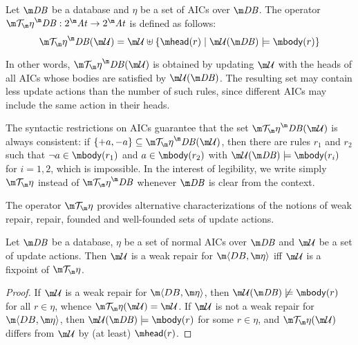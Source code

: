 \begin{definition}
  Let $\db$ be a database and $\eta$ be a set of AICs over $\db$.
  The operator $\Op^\db:2^\atoms\to 2^\atoms$ is defined as follows:
  \[
    \Op^\db(\UU) = \UU\uplus\{\head(r)\mid \UU(\db)\models\body(r)\}
  \]
\end{definition}
In other words, $\Op^\db(\UU)$ is obtained by updating $\UU$ with the heads of all AICs whose bodies are satisfied by $\UU(\db)$.
The resulting set may contain less update actions than the number of such rules, since different AICs may include the same action in their heads.



The syntactic restrictions on AICs guarantee that the set $\Op^\db(\UU)$ is always consistent: if $\{+a,-a\}\subseteq\Op^\db(\UU)$, then there are rules $r_1$ and $r_2$ such that $\neg a\in\body(r_1)$ and $a\in\body(r_2)$ with $\UU(\db)\models\body(r_i)$ for $i=1,2$, which is impossible.
In the interest of legibility, we write simply $\Op$ instead of $\Op^\db$ whenever $\db$ is clear from the context.

The operator $\Op$ provides alternative characterizations of the notions of weak repair, repair, founded and well-founded sets of update actions.

\begin{lemma}
  \label{lem:weak-repair}
  Let $\db$ be a database, $\eta$ be a set of normal AICs over $\db$ and $\UU$ be a set of update actions.
  Then $\UU$ is a weak repair for $\fulldb$ iff $\UU$ is a fixpoint of $\Op$.
\end{lemma}
\begin{proof}
  If $\UU$ is a weak repair for $\fulldb$, then $\UU(\db)\not\models\body(r)$ for all $r\in\eta$, whence $\Op(\UU)=\UU$.
  If $\UU$ is not a weak repair for $\fulldb$, then $\UU(\db)\models\body(r)$ for some $r\in\eta$, and $\Op(\UU)$ differs from $\UU$ by (at least) $\head(r)$.
\end{proof}

